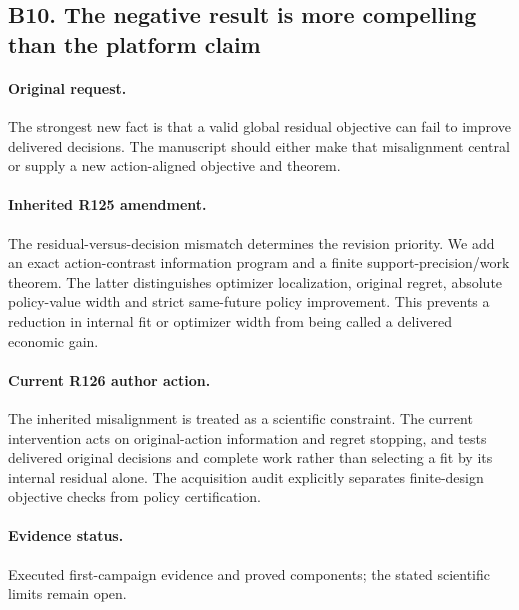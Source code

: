 \subsection*{B10. The negative result is more compelling than the platform claim}
\paragraph{Original request.} The strongest new fact is that a valid global residual objective can fail to improve delivered decisions. The manuscript should either make that misalignment central or supply a new action-aligned objective and theorem.

\paragraph{Inherited R125 amendment.} The residual-versus-decision mismatch determines the revision priority. We add an exact action-contrast information program and a finite support-precision/work theorem. The latter distinguishes optimizer localization, original regret, absolute policy-value width and strict same-future policy improvement. This prevents a reduction in internal fit or optimizer width from being called a delivered economic gain.

\paragraph{Current R126 author action.} The inherited misalignment is treated as a scientific constraint. The current intervention acts on original-action information and regret stopping, and tests delivered original decisions and complete work rather than selecting a fit by its internal residual alone. The acquisition audit explicitly separates finite-design objective checks from policy certification.

\paragraph{Evidence status.} Executed first-campaign evidence and proved components; the stated scientific limits remain open.

